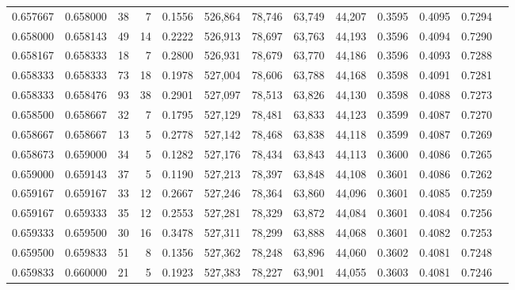 \begin{tabular}{rrrrrrrrrrrrr}
0.657667 & 0.658000 &    38 &   7 &                                     0.1556 & 526,864 &  78,746 &  63,749 &  44,207 & 0.3595 & 0.4095 & 0.7294 \\
0.658000 & 0.658143 &    49 &  14 &                                     0.2222 & 526,913 &  78,697 &  63,763 &  44,193 & 0.3596 & 0.4094 & 0.7290 \\
0.658167 & 0.658333 &    18 &   7 &                                     0.2800 & 526,931 &  78,679 &  63,770 &  44,186 & 0.3596 & 0.4093 & 0.7288 \\
0.658333 & 0.658333 &    73 &  18 &                                     0.1978 & 527,004 &  78,606 &  63,788 &  44,168 & 0.3598 & 0.4091 & 0.7281 \\
0.658333 & 0.658476 &    93 &  38 &                                     0.2901 & 527,097 &  78,513 &  63,826 &  44,130 & 0.3598 & 0.4088 & 0.7273 \\
0.658500 & 0.658667 &    32 &   7 &                                     0.1795 & 527,129 &  78,481 &  63,833 &  44,123 & 0.3599 & 0.4087 & 0.7270 \\
0.658667 & 0.658667 &    13 &   5 &                                     0.2778 & 527,142 &  78,468 &  63,838 &  44,118 & 0.3599 & 0.4087 & 0.7269 \\
0.658673 & 0.659000 &    34 &   5 &                                     0.1282 & 527,176 &  78,434 &  63,843 &  44,113 & 0.3600 & 0.4086 & 0.7265 \\
0.659000 & 0.659143 &    37 &   5 &                                     0.1190 & 527,213 &  78,397 &  63,848 &  44,108 & 0.3601 & 0.4086 & 0.7262 \\
0.659167 & 0.659167 &    33 &  12 &                                     0.2667 & 527,246 &  78,364 &  63,860 &  44,096 & 0.3601 & 0.4085 & 0.7259 \\
0.659167 & 0.659333 &    35 &  12 &                                     0.2553 & 527,281 &  78,329 &  63,872 &  44,084 & 0.3601 & 0.4084 & 0.7256 \\
0.659333 & 0.659500 &    30 &  16 &                                     0.3478 & 527,311 &  78,299 &  63,888 &  44,068 & 0.3601 & 0.4082 & 0.7253 \\
0.659500 & 0.659833 &    51 &   8 &                                     0.1356 & 527,362 &  78,248 &  63,896 &  44,060 & 0.3602 & 0.4081 & 0.7248 \\
0.659833 & 0.660000 &    21 &   5 &                                     0.1923 & 527,383 &  78,227 &  63,901 &  44,055 & 0.3603 & 0.4081 & 0.7246 \\

\end{tabular}
